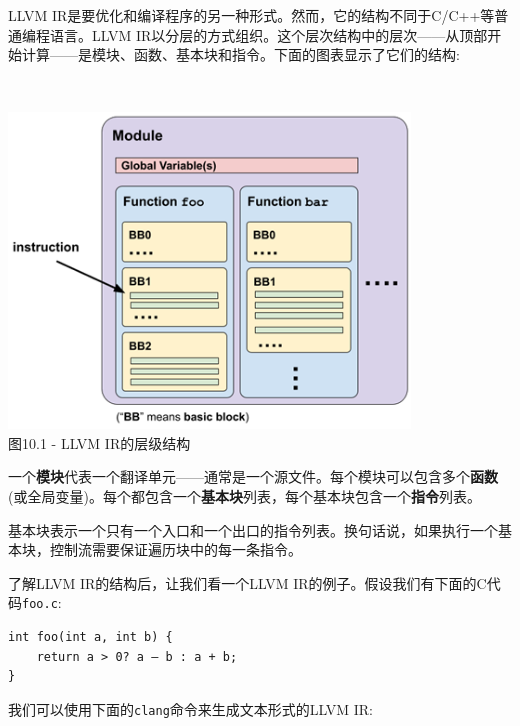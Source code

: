 LLVM IR是要优化和编译程序的另一种形式。然而，它的结构不同于C/C++等普通编程语言。LLVM IR以分层的方式组织。这个层次结构中的层次——从顶部开始计算——是模块、函数、基本块和指令。下面的图表显示了它们的结构:

\hspace*{\fill} \\ %
\begin{center}
\includegraphics[width=0.8\textwidth]{content/3/chapter10/images/1.png}\\
图10.1 - LLVM IR的层级结构
\end{center}

一个\textbf{模块}代表一个翻译单元——通常是一个源文件。每个模块可以包含多个\textbf{函数}(或全局变量)。每个都包含一个\textbf{基本块}列表，每个基本块包含一个\textbf{指令}列表。

\begin{tcolorbox}[colback=blue!5!white,colframe=blue!75!black, fonttitle=\bfseries,title=简要介绍——基本块]	
\hspace*{0.7cm}基本块表示一个只有一个入口和一个出口的指令列表。换句话说，如果执行一个基本块，控制流需要保证遍历块中的每一条指令。
\end{tcolorbox}

了解LLVM IR的结构后，让我们看一个LLVM IR的例子。假设我们有下面的C代码\texttt{foo.c}:

\begin{lstlisting}[style=styleCXX]
int foo(int a, int b) {
	return a > 0? a – b : a + b;
}
\end{lstlisting}

我们可以使用下面的\texttt{clang}命令来生成文本形式的LLVM IR:


